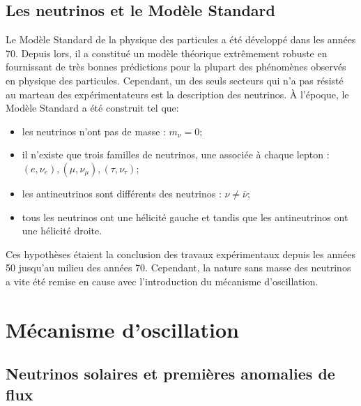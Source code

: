 \bigbreak

\subsection{Les neutrinos et le Modèle Standard}


Le Modèle Standard de la physique des particules a été développé dans les années 70. Depuis lors, il a constitué un modèle théorique extrêmement robuste en fournissant de très bonnes prédictions pour la plupart des phénomènes observés en physique des particules. Cependant, un des seuls secteurs qui n'a pas résisté au marteau des expérimentateurs est la description des neutrinos. À l'époque, le Modèle Standard a été construit tel que:

\begin{itemize}[label=$\bullet$]
    \item les neutrinos n'ont pas de masse : $m_\nu = 0$;
    \item il n'existe que trois familles de neutrinos, une associée à chaque lepton : $(e, \nu_e), (\mu, \nu_\mu), (\tau, \nu_\tau)$;
    \item les antineutrinos sont différents des neutrinos : $\nu \neq \overline{\nu}$;
    \item tous les neutrinos ont une hélicité gauche et tandis que les antineutrinos ont une hélicité droite.
\end{itemize}

\bigbreak

Ces hypothèses étaient la conclusion des travaux expérimentaux depuis les années 50 jusqu'au milieu des années 70. Cependant, la nature sans masse des neutrinos a vite été remise en cause avec l'introduction du mécanisme d'oscillation.



\bigbreak

\section{Mécanisme d'oscillation}

\subsection{Neutrinos solaires et premières anomalies de flux}

